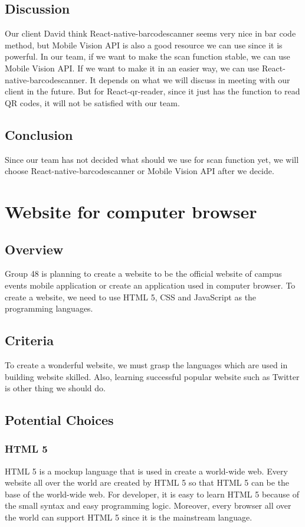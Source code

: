 \documentclass[letterpaper, 10pt,titlepage]{article}
\begin{document}
\subsection{Discussion}
Our client David think React-native-barcodescanner seems very nice in bar code method, but Mobile Vision API is also a good resource we can use since it is powerful. In our team, if we want to make the scan function stable, we can use Mobile Vision API. If we want to make it in  an easier way, we can use React-native-barcodescanner. It depends on what we will discuss in meeting with our client in the future. But for React-qr-reader, since it just has the function to read QR codes, it will not be satisfied with our team.

\subsection{Conclusion}
Since our team has not decided what should we use for scan function yet, we will choose React-native-barcodescanner or Mobile Vision API after we decide.


\section{Website for computer browser}

\subsection{Overview}
Group 48 is planning to create a website to be the official website of campus events mobile application or create an application used in computer browser. To create a website, we need to use HTML 5, CSS and JavaScript as the programming languages.

\subsection{Criteria}
To create a wonderful website, we must grasp the languages which are used in building website skilled. Also, learning successful popular website such as Twitter is other thing we should do.

\subsection{Potential Choices}

\subsubsection{HTML 5}
HTML 5 is a mockup language that is used in create a world-wide web. Every website all over the world are created by HTML 5 so that HTML 5 can be the base of the world-wide web. For developer, it is easy to learn HTML 5 because of the small syntax and easy programming logic. Moreover, every browser all over the world can support HTML 5 since it is the mainstream language.
\end{document}

